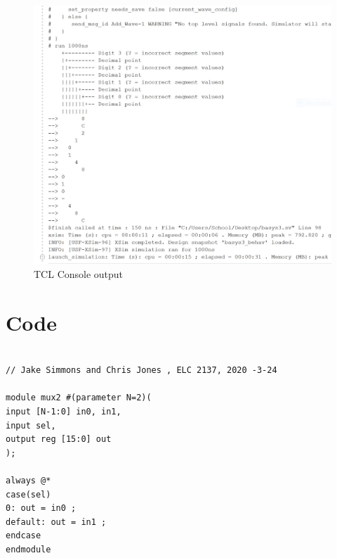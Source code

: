 \documentclass[11pt]{article}
\begin{document}
\begin{figure}[ht]\centering
	
	\includegraphics[width=1.0\textwidth]{TCL_Console}
	\caption{TCL Console output }
	\label{fig:sim_with_table}
\end{figure}


\clearpage


\section*{Code}

\begin{lstlisting}[style=Verilog,caption=Mux 2 source files ,label=code:ex ]

// Jake Simmons and Chris Jones , ELC 2137, 2020 -3-24

module mux2 #(parameter N=2)(
input [N-1:0] in0, in1,
input sel,
output reg [15:0] out
);

always @*
case(sel)
0: out = in0 ;
default: out = in1 ;
endcase
endmodule



\end{lstlisting}
\end{document}

